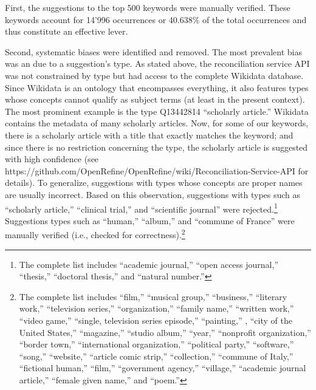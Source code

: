 First, the suggestions to the top 500 keywords were manually verified.
These keywords account for 14'996 occurrences or 40.638\% of the total
occurrences and thus constitute an effective lever.

Second, systematic biases were identified and removed. The most
prevalent bias was an due to a suggestion's type. As stated above, the
reconciliation service API was not constrained by type but had access to
the complete Wikidata database. Since Wikidata is an ontology that
encompasses everything, it also features types whose concepts cannot
qualify as subject terms (at least in the present context). The most
prominent example is the type Q13442814 ``scholarly article.'' Wikidata
contains the metadata of many scholarly articles. Now, for some of our
keywords, there is a scholarly article with a title that exactly matches
the keyword; and since there is no restriction concerning the type, the
scholarly article is suggested with high confidence (see
https://github.com/OpenRefine/OpenRefine/wiki/Reconciliation-Service-API
for details). To generalize, suggestions with types whose concepts are
proper names are usually incorrect. Based on this observation,
suggestions with types such as ``scholarly article,'' ``clinical
trial,'' and ``scientific journal'' were rejected.\footnote{The complete
  list includes ``academic journal,'' ``open access journal,''
  ``thesis,'' ``doctoral thesis,'' and ``natural number.''} Suggestions
types such as ``human,'' ``album,'' and ``commune of France'' were
manually verified (i.e., checked for correctness).\footnote{The complete
  list includes ``film,'' ``musical group,'' ``business,'' ``literary
  work,'' ``television series,'' ``organization,'' ``family name,''
  ``written work,'' ``video game,'' ``single, television series
  episode,'' ``painting,'' , ``city of the United States,''
  ``magazine,'' ``studio album,'' ``year,'' ``nonprofit organization,''
  ``border town,'' ``international organization,'' ``political party,''
  ``software,'' ``song,'' ``website,'' ``article comic strip,''
  ``collection,'' ``commune of Italy,'' ``fictional human,'' ``film,''
  ``government agency,'' ``village,'' ``academic journal article,''
  ``female given name,'' and ``poem.''}

